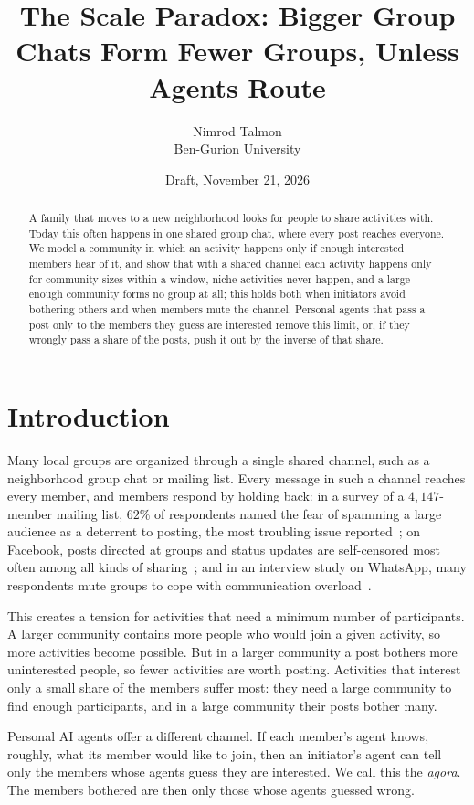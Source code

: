 \documentclass[11pt]{article}
\title{The Scale Paradox: Bigger Group Chats Form Fewer Groups, Unless Agents Route}
\author{Nimrod Talmon\\ Ben-Gurion University}
\date{Draft, November 21, 2026}
\theoremstyle{definition}
\begin{document}
\maketitle

\begin{abstract}
A family that moves to a new neighborhood looks for people to share activities with. Today this often happens in one shared group chat, where every post reaches everyone. We model a community in which an activity happens only if enough interested members hear of it, and show that with a shared channel each activity happens only for community sizes within a window, niche activities never happen, and a large enough community forms no group at all; this holds both when initiators avoid bothering others and when members mute the channel. Personal agents that pass a post only to the members they guess are interested remove this limit, or, if they wrongly pass a share of the posts, push it out by the inverse of that share.
\end{abstract}

\section{Introduction}
Many local groups are organized through a single shared channel, such as a neighborhood group chat or mailing list. Every message in such a channel reaches every member, and members respond by holding back: in a survey of a $4{,}147$-member mailing list, $62\%$ of respondents named the fear of spamming a large audience as a deterrent to posting, the most troubling issue reported~\cite{zhang2015mailing}; on Facebook, posts directed at groups and status updates are self-censored most often among all kinds of sharing~\cite{das2013self}; and in an interview study on WhatsApp, many respondents mute groups to cope with communication overload~\cite{mols2020whatsapp}.

This creates a tension for activities that need a minimum number of participants. A larger community contains more people who would join a given activity, so more activities become possible. But in a larger community a post bothers more uninterested people, so fewer activities are worth posting. Activities that interest only a small share of the members suffer most: they need a large community to find enough participants, and in a large community their posts bother many.

Personal AI agents offer a different channel. If each member's agent knows, roughly, what its member would like to join, then an initiator's agent can tell only the members whose agents guess they are interested. We call this the \emph{agora}. The members bothered are then only those whose agents guessed wrong.
\end{document}
